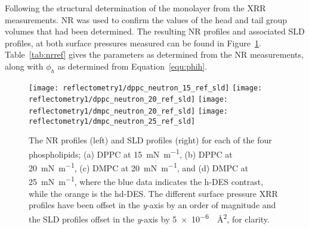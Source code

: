 Following the structural determination of the monolayer from the XRR measurements.
NR was used to confirm the values of the head and tail group volumes that had been determined.
The resulting NR profiles and associated SLD profiles, at both surface pressures measured can be found in Figure~\ref{fig:nrref}.
Table~\ref{tab:nrref} gives the parameters as determined from the NR measurements, along with $\phi_h$ as determined from Equation~\ref{equ:phih}.
%
\begin{figure}
    \centering
    \texttt{[image: reflectometry1/dppc\_neutron\_15\_ref\_sld]}
    \texttt{[image: reflectometry1/dppc\_neutron\_20\_ref\_sld]}
    \texttt{[image: reflectometry1/dmpc\_neutron\_20\_ref\_sld]}
    \texttt{[image: reflectometry1/dmpc\_neutron\_25\_ref\_sld]}
    \caption{The NR profiles (left) and SLD profiles (right) for each of the four phospholipids; (a) DPPC at \SI{15}{\milli\newton\per\meter}, (b) DPPC at \SI{20}{\milli\newton\per\meter}, (c) DMPC at \SI{20}{\milli\newton\per\meter}, and (d) DMPC at \SI{25}{\milli\newton\per\meter}, where the blue data indicates the h-DES contrast, while the orange is the hd-DES. The different surface pressure XRR profiles have been offset in the \emph{y}-axis by an order of magnitude and the SLD profiles offset in the \emph{y}-axis by \SI{5e-6}{\per\angstrom\squared}, for clarity.}
    \label{fig:nrref}
\end{figure}
%
%

